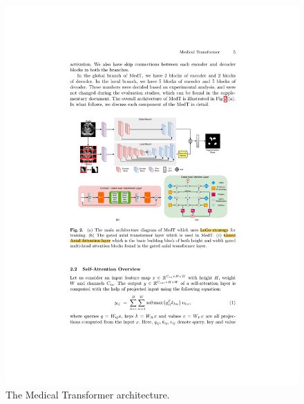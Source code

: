 \begin{figure}[htb!]
  \centering
  \includegraphics[width=\textwidth]{assets/med_t.pdf}
  \caption{The Medical Transformer architecture.}
  \label{med_t}
\end{figure}

